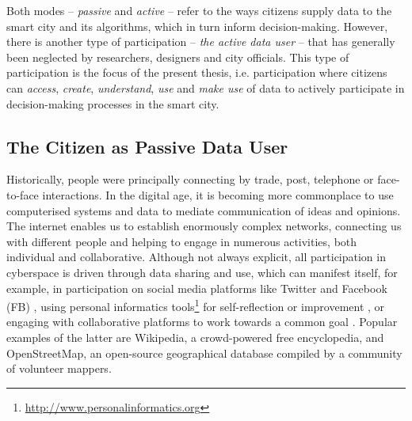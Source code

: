 Both modes -- \textit{passive} and \textit{active} -- refer to the ways citizens supply data to the smart city and its algorithms, which in turn inform decision-making. However, there is another type of participation -- \textit{the active data user} -- that has generally been neglected by researchers, designers and city officials. This type of participation is the focus of the present thesis, i.e. participation where citizens can \textit{access}, \textit{create}, \textit{understand}, \textit{use} and \textit{make use} of data to actively participate in decision-making processes in the smart city.

\subsection{The Citizen as Passive Data User}
\label{sub:passive-user}
Historically, people were principally connecting by trade, post, telephone or face-to-face interactions. In the digital age, it is becoming more commonplace to use computerised systems and data to mediate communication of ideas and opinions. The internet enables us to establish enormously complex networks, connecting us with different people and helping to engage in numerous activities, both individual and collaborative. Although not always explicit, all participation in cyberspace is driven through data sharing and use, which can manifest itself, for example, in participation on social media platforms like Twitter and Facebook (FB) \citep{crivellaro_pool_2014}, using personal informatics tools\footnote{\url{http://www.personalinformatics.org}} for self-reflection or improvement \citep{li_stage-based_2010,epstein_personal_2015,epstein_lived_2015}, or engaging with collaborative platforms to work towards a common goal \citep{salovaara_collective_2006}. Popular examples of the latter are Wikipedia, a crowd-powered free encyclopedia, and OpenStreetMap, an open-source geographical database compiled by a community of volunteer mappers.

